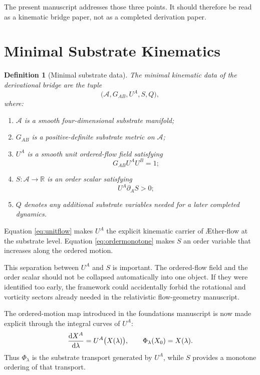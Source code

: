 \documentclass[11pt]{article}
\newcommand{\Aflow}{\AE{}ther-flow}
\newcommand{\Sub}{\mathcal{A}}
\newtheorem{definition}{Definition}
\begin{document}
The present manuscript addresses those three points. It should therefore be read as a kinematic bridge paper, not as a completed derivation paper.

\section{Minimal Substrate Kinematics}

\begin{definition}[Minimal substrate data]
The minimal kinematic data of the derivational bridge are the tuple
\[
\bigl(\Sub, G_{AB}, U^A, S, Q\bigr),
\]
where:
\begin{enumerate}
    \item \(\Sub\) is a smooth four-dimensional substrate manifold;
    \item \(G_{AB}\) is a positive-definite substrate metric on \(\Sub\);
    \item \(U^A\) is a smooth unit ordered-flow field satisfying
    \begin{equation}
    G_{AB} U^A U^B = 1;
    \label{eq:unitflow}
    \end{equation}
    \item \(S:\Sub \to \mathbb{R}\) is an order scalar satisfying
    \begin{equation}
    U^A \partial_A S > 0;
    \label{eq:ordermonotone}
    \end{equation}
    \item \(Q\) denotes any additional substrate variables needed for a later completed dynamics.
\end{enumerate}
\end{definition}

Equation \eqref{eq:unitflow} makes \(U^A\) the explicit kinematic carrier of \Aflow{} at the substrate level. Equation \eqref{eq:ordermonotone} makes \(S\) an order variable that increases along the ordered motion.

This separation between \(U^A\) and \(S\) is important. The ordered-flow field and the order scalar should not be collapsed automatically into one object. If they were identified too early, the framework could accidentally forbid the rotational and vorticity sectors already needed in the relativistic flow-geometry manuscript.

The ordered-motion map introduced in the foundations manuscript is now made explicit through the integral curves of \(U^A\):
\begin{equation}
\dv{X^A}{\lambda} = U^A\bigl(X(\lambda)\bigr),
\qquad
\Phi_\lambda(X_0) = X(\lambda).
\label{eq:flowmap}
\end{equation}
Thus \(\Phi_\lambda\) is the substrate transport generated by \(U^A\), while \(S\) provides a monotone ordering of that transport.
\end{document}

